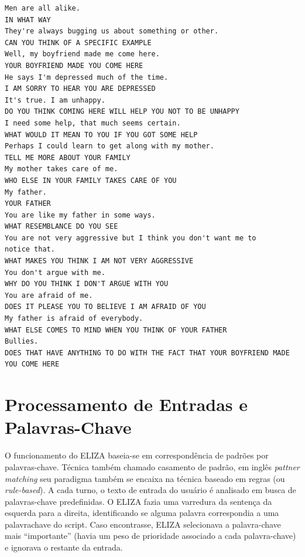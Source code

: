 \documentclass[14pt,a4paper,oneside]{book}
\begin{document}
\begin{lstlisting}[language=Clean, caption=Exemplo de diálogo do ELIZA, label=lst:exemplodialogoeliza]
Men are all alike. 
IN WHAT WAY 
They're always bugging us about something or other. 
CAN YOU THINK OF A SPECIFIC EXAMPLE 
Well, my boyfriend made me come here. 
YOUR BOYFRIEND MADE YOU COME HERE 
He says I'm depressed much of the time. 
I AM SORRY TO HEAR YOU ARE DEPRESSED 
It's true. I am unhappy. 
DO YOU THINK COMING HERE WILL HELP YOU NOT TO BE UNHAPPY 
I need some help, that much seems certain. 
WHAT WOULD IT MEAN TO YOU IF YOU GOT SOME HELP 
Perhaps I could learn to get along with my mother. 
TELL ME MORE ABOUT YOUR FAMILY 
My mother takes care of me. 
WHO ELSE IN YOUR FAMILY TAKES CARE OF YOU 
My father. 
YOUR FATHER 
You are like my father in some ways. 
WHAT RESEMBLANCE DO YOU SEE 
You are not very aggressive but I think you don't want me to 
notice that. 
WHAT MAKES YOU THINK I AM NOT VERY AGGRESSIVE 
You don't argue with me. 
WHY DO YOU THINK I DON'T ARGUE WITH YOU 
You are afraid of me. 
DOES IT PLEASE YOU TO BELIEVE I AM AFRAID OF YOU 
My father is afraid of everybody. 
WHAT ELSE COMES TO MIND WHEN YOU THINK OF YOUR FATHER 
Bullies. 
DOES THAT HAVE ANYTHING TO DO WITH THE FACT THAT YOUR BOYFRIEND MADE YOU COME HERE 
\end{lstlisting}
	




\section{Processamento de Entradas e Palavras-Chave}

O funcionamento do ELIZA baseia-se em correspondência de padrões por palavras-chave. Técnica também chamado casamento de padrão, em inglês \textit{pattner matching} seu paradigma também se encaixa na técnica baseado em regras (ou \textit{rule-based}). 
A cada turno, o texto de entrada do usuário é analisado em busca de palavras-chave predefinidas. 
O ELIZA fazia uma varredura da sentença da esquerda para a direita, identificando se alguma palavra correspondia a uma palavra\-chave do script. 
Caso encontrasse, ELIZA selecionava a palavra-chave mais “importante” (havia um peso de prioridade associado a cada palavra-chave) e ignorava o restante da entrada.
\end{document}
